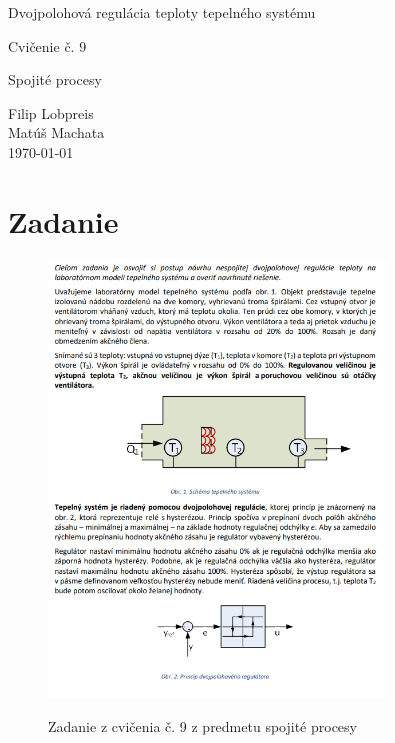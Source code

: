 \documentclass{article}
\begin{document}
\begin{titlepage}
	\null\vfill

	\begin{center}
		{\Huge Dvojpolohová regulácia teploty tepelného systému }
		\vskip 2cm

		{\Large Cvičenie č. 9}
		\vskip 0.5cm

		{\large Spojité procesy}
	\end{center}

	\vfill
	\vfill

	\begin{flushright}
		Filip Lobpreis \\
		Matúš Machata \\
		\small\today\\
	\end{flushright}
	\hfill
\end{titlepage}

\thispagestyle{empty}
\clearpage

\tableofcontents
\thispagestyle{empty}
\clearpage

\section{Zadanie}
\label{sec:zadanie}

\begin{figure}[!htbp]
	\begin{center}
		\label{fig:zadanie}
		\includegraphics[width=0.8\textwidth]{./include/zadanie.png}
	\end{center}
	\caption{Zadanie z cvičenia č. 9 z predmetu spojité procesy}
\end{figure}
\end{document}
